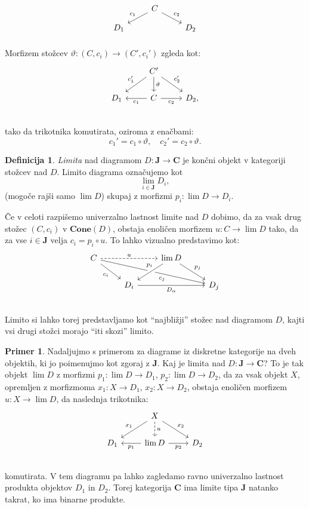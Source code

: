 \documentclass[12pt,a4paper]{book}
\theoremstyle{definition}
\newtheorem{definicija}{Definicija}[chapter]
\theoremstyle{plain}
\theoremstyle{definition}
\newtheorem{primer}{Primer}[section]
\theoremstyle{remark}
\newcommand{\cat}[1]{\textbf{#1}}
\begin{document}
%
$$\begin{tikzcd}[column sep=normal, row sep=small]
& C \ar[dl, "c_1"'] \ar[dr, "c_2"] & \\
D_1 && D_2 \\
\end{tikzcd}$$
%
Morfizem stožcev $\vartheta : (C,c_i) \to (C', c_i')$ zgleda kot:
%
$$\begin{tikzcd}
& C' \ar[dl, "c_1'"'] \ar[d, "\vartheta"] \ar[dr, "c_2'"] & \\
D_1 & C \ar[l, "c_1"] \ar[r, "c_2"'] & D_2, \\
\end{tikzcd}$$
%
tako da trikotnika komutirata, oziroma z enačbami:
$$c_1' = c_1 \circ \vartheta, \quad c_2' = c_2 \circ \vartheta.$$
%
\begin{definicija}
\emph{Limita} nad diagramom $D : \cat{J} \to \cat{C}$ je končni objekt v kategoriji stožcev nad $D$. Limito diagrama označujemo kot
$$\lim_{i \in \cat{J}}D_i,$$
(mogoče rajši samo $\lim D$)
skupaj z morfizmi $p_i : \lim D \to D_i$.
\end{definicija}
%
Če v celoti razpišemo univerzalno lastnost limite nad $D$ dobimo, da za vsak drug stožec $(C,c_i)$ v $\cat{Cone}(D)$, obstaja enoličen morfizem $u : C \to \lim D$ tako, da za vse $i \in \cat{J}$ velja $c_i = p_i \circ u$. To lahko vizualno predstavimo kot:
%
$$\begin{tikzcd}
C \ar[rr, dashed, "u"] \ar[drrr, pos=7/11, "c_j"'] \ar[dr, "c_i"'] & & \lim D \ar[dl, crossing over, pos=1/3, "p_i"'] \ar[dr, "p_j"] \\
& D_i \ar[rr, "D_\alpha"'] & & D_j \\
\end{tikzcd}$$
%
Limito si lahko torej predstavljamo kot "`najbližji"' stožec nad diagramom $D$, kajti vsi drugi stožci morajo "`iti skozi"' limito. 

\begin{primer}
Nadaljujmo s primerom za diagrame iz diskretne kategorije na dveh objektih, ki jo poimenujmo kot zgoraj z $\cat{J}$. Kaj je limita nad $D : \cat{J} \to \cat{C}$? To je tak objekt $\lim D$ z morfizmi $p_1 : \lim D \to D_1$, $p_2 : \lim D \to D_2$, da za vsak objekt $X$, opremljen z morfizmoma $x_1 : X \to D_1$, $x_2 : X \to D_2$, obstaja enoličen morfizem $u : X \to \lim D$, da naslednja trikotnika:
%
$$\begin{tikzcd}
& X \ar[dl, "x_1"'] \ar[d, dashed, "u"] \ar[dr, "x_2"] & \\
D_1 & \lim D \ar[l, "p_1"] \ar[r, "p_2"'] & D_2 \\
\end{tikzcd}$$
komutirata. V tem diagramu pa lahko zagledamo ravno univerzalno lastnost produkta objektov $D_1$ in $D_2$. Torej kategorija $\cat{C}$ ima limite tipa $\cat{J}$ natanko takrat, ko ima binarne produkte.

\end{primer}
\end{document}
